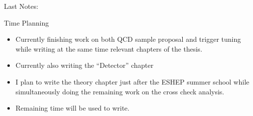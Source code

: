 \documentclass[8pt]{beamer}
\begin{document}
\begin{frame}{Last Notes:}

\begin{block}{Time Planning}

\begin{itemize}
  \item Currently finishing work on both QCD sample proposal and trigger tuning while writing at the same time relevant chapters of the thesis. 
  \item Currently also writing the ``Detector'' chapter
  \item I plan to write the theory chapter just after the ESHEP summer school while simultaneously doing the remaining work on the cross check analysis.
  \item Remaining time will be used to write.
\end{itemize}

\end{block}

\end{frame}
\end{document}
